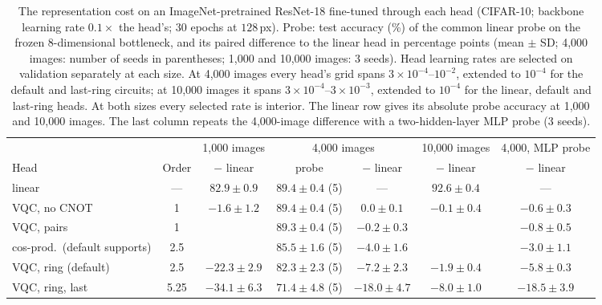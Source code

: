 \begin{table}[t]
\centering
\caption{The representation cost on an ImageNet-pretrained ResNet-18 fine-tuned through each
head (CIFAR-10; backbone learning rate $0.1\times$ the head's; 30 epochs at $128$\,px). Probe:
test accuracy (\%) of the common linear probe on the frozen 8-dimensional bottleneck, and its
paired difference to the linear head in percentage points (mean $\pm$ SD; 4,000 images: number
of seeds in parentheses; 1,000 and 10,000 images: 3 seeds). Head learning rates are selected
on validation separately at each size. At 4,000 images every head's grid spans
$3\times10^{-4}$--$10^{-2}$, extended to $10^{-4}$ for the default and last-ring circuits; at
10,000 images it spans $3\times10^{-4}$--$3\times10^{-3}$, extended to $10^{-4}$ for the linear,
default and last-ring heads. At both sizes every selected rate is interior. The linear row gives its absolute probe accuracy at 1,000 and 10,000 images. The last column repeats the 4,000-image difference with a two-hidden-layer MLP probe (3 seeds).}
\label{tab:pretrained}
\small
\setlength{\tabcolsep}{4pt}
\begin{tabular}{lcccccc}
\toprule
& & 1,000 images & \multicolumn{2}{c}{4,000 images} & 10,000 images & 4,000, MLP probe \\
\cmidrule(lr){3-3}\cmidrule(lr){4-5}\cmidrule(lr){6-6}\cmidrule(lr){7-7}
Head & Order & $-$ linear & probe & $-$ linear & $-$ linear & $-$ linear \\
\midrule
linear & --- & $82.9 \pm 0.9$ & $89.4 \pm 0.4$ (5) & --- & $92.6 \pm 0.4$ & --- \\
VQC, no CNOT & 1 & $-1.6 \pm 1.2$ & $89.4 \pm 0.4$ (5) & $0.0 \pm 0.1$ & $-0.1 \pm 0.4$ & $-0.6 \pm 0.3$ \\
VQC, pairs & 1 &  & $89.3 \pm 0.4$ (5) & $-0.2 \pm 0.3$ &  & $-0.8 \pm 0.5$ \\
cos-prod.\ (default supports) & 2.5 &  & $85.5 \pm 1.6$ (5) & $-4.0 \pm 1.6$ &  & $-3.0 \pm 1.1$ \\
VQC, ring (default) & 2.5 & $-22.3 \pm 2.9$ & $82.3 \pm 2.3$ (5) & $-7.2 \pm 2.3$ & $-1.9 \pm 0.4$ & $-5.8 \pm 0.3$ \\
VQC, ring, last & 5.25 & $-34.1 \pm 6.3$ & $71.4 \pm 4.8$ (5) & $-18.0 \pm 4.7$ & $-8.0 \pm 1.0$ & $-18.5 \pm 3.9$ \\
\bottomrule
\end{tabular}
\end{table}

